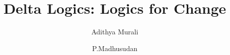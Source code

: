\documentclass{llncs}
\begin{document}
\newcommand{\HLS}{\textit{HLS}}
\newcommand{\sem}[1]{\llbracket #1 \rrbracket}
\pagestyle{plain} %

\title{Delta Logics: Logics for Change}
\author{Adithya Murali \and
  P.\@ Madhusudan
}


\maketitle

\begin{abstract}
~\\
\end{abstract}


%





\end{document}
